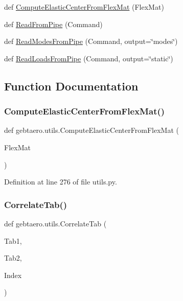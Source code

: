 \begin{DoxyCompactItemize}
def \hyperlink{namespacegebtaero_1_1utils_ac3a921856ec921436caee59af0838d06}{Compute\+Elastic\+Center\+From\+Flex\+Mat} (Flex\+Mat)
\item 
def \hyperlink{namespacegebtaero_1_1utils_ad35c5461b34c42fdf3fb6abb8c21a46d}{Read\+From\+Pipe} (Command)
\item 
def \hyperlink{namespacegebtaero_1_1utils_a79bf2fa9cdad677abf70cacde7abcf9e}{Read\+Modes\+From\+Pipe} (Command, output=\char`\"{}modes\char`\"{})
\item 
def \hyperlink{namespacegebtaero_1_1utils_ad2812937cff40c12f0af963ab0b429b6}{Read\+Loads\+From\+Pipe} (Command, output=\char`\"{}static\char`\"{})
\end{DoxyCompactItemize}


\subsection{Function Documentation}
\mbox{\label{namespacegebtaero_1_1utils_ac3a921856ec921436caee59af0838d06}} 
\subsubsection{\texorpdfstring{Compute\+Elastic\+Center\+From\+Flex\+Mat()}{ComputeElasticCenterFromFlexMat()}}
{\footnotesize\ttfamily def gebtaero.\+utils.\+Compute\+Elastic\+Center\+From\+Flex\+Mat (\begin{DoxyParamCaption}\item[{}]{Flex\+Mat }\end{DoxyParamCaption})}



Definition at line 276 of file utils.\+py.

\mbox{\label{namespacegebtaero_1_1utils_a49dfe8af29c3ae64bc75195f0a88a1ce}} 
\subsubsection{\texorpdfstring{Correlate\+Tab()}{CorrelateTab()}}
{\footnotesize\ttfamily def gebtaero.\+utils.\+Correlate\+Tab (\begin{DoxyParamCaption}\item[{}]{Tab1,  }\item[{}]{Tab2,  }\item[{}]{Index }\end{DoxyParamCaption})}



